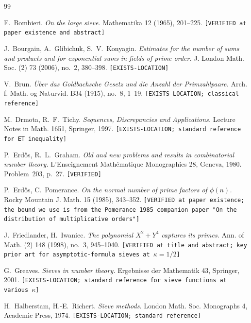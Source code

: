 \documentclass[11pt,a4paper]{article}
\theoremstyle{plain}
\theoremstyle{definition}
\theoremstyle{remark}
\begin{document}
\begin{thebibliography}{99}

E.~Bombieri.
\emph{On the large sieve.}
Mathematika 12 (1965), 201--225.
\texttt{[VERIFIED at paper existence and abstract]}

J.~Bourgain, A.~Glibichuk, S.~V.~Konyagin.
\emph{Estimates for the number of sums and products and for
exponential sums in fields of prime order.}
J. London Math. Soc. (2) 73 (2006), no.~2, 380--398.
\texttt{[EXISTS-LOCATION]}

V.~Brun.
\emph{\"Uber das Goldbachsche Gesetz und die Anzahl der Primzahlpaare.}
Arch. f. Math. og Naturvid. B34 (1915), no.~8, 1--19.
\texttt{[EXISTS-LOCATION; classical reference]}

M.~Drmota, R.~F.~Tichy.
\emph{Sequences, Discrepancies and Applications.}
Lecture Notes in Math. 1651, Springer, 1997.
\texttt{[EXISTS-LOCATION; standard reference for ET inequality]}

P.~Erd\H{o}s, R.~L.~Graham.
\emph{Old and new problems and results in combinatorial number theory.}
L'Enseignement Math\'ematique Monographies 28, Geneva, 1980.
Problem~203, p.~27.
\texttt{[VERIFIED]}

P.~Erd\H{o}s, C.~Pomerance.
\emph{On the normal number of prime factors of $\phi(n)$.}
Rocky Mountain J. Math. 15 (1985), 343--352.
\texttt{[VERIFIED at paper existence; the bound we use is from the
Pomerance 1985 companion paper "On the distribution of multiplicative
orders"]}

J.~Friedlander, H.~Iwaniec.
\emph{The polynomial $X^{2} + Y^{4}$ captures its primes.}
Ann. of Math. (2) 148 (1998), no.~3, 945--1040.
\texttt{[VERIFIED at title and abstract; key prior art for
asymptotic-formula sieves at $\kappa = 1/2$]}

G.~Greaves.
\emph{Sieves in number theory.}
Ergebnisse der Mathematik 43, Springer, 2001.
\texttt{[EXISTS-LOCATION; standard reference for sieve functions at
various $\kappa$]}

H.~Halberstam, H.-E.~Richert.
\emph{Sieve methods.}
London Math. Soc. Monographs 4, Academic Press, 1974.
\texttt{[EXISTS-LOCATION; standard reference]}


\end{thebibliography}
\end{document}
